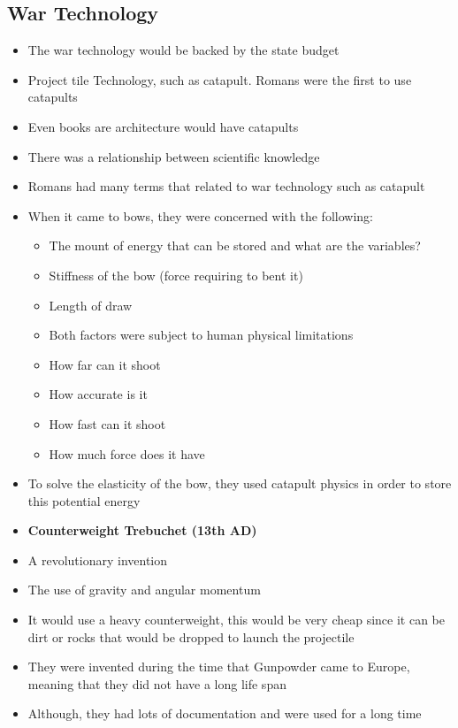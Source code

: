 \documentclass{article}
\begin{document}
\subsection{War Technology}
\begin{itemize}
  \item The war technology would be backed by the state budget
  \item Project tile Technology, such as catapult.
    Romans were the first to use catapults
  \item Even books are architecture would have catapults
  \item There was a relationship between scientific knowledge
  \item Romans had many terms that related to war technology such as catapult
  \item When it came to bows, they were concerned with the following:
    \begin{itemize}
      \item The mount of energy that can be stored and what are
        the variables?
      \item Stiffness of the bow (force requiring to bent it)
      \item Length of draw
      \item Both factors were subject
        to human physical limitations
      \item How far can it shoot
      \item How accurate is it
      \item How fast can it shoot
      \item How much force does it have
    \end{itemize}
  \item To solve the elasticity of the bow, they
    used catapult physics in order to store
    this potential energy
  \item \textbf{Counterweight Trebuchet (13th AD)}
  \item A revolutionary invention
  \item The use of gravity and angular momentum
  \item It would use a heavy counterweight,
    this would be very cheap since it can be dirt or rocks
    that would be dropped to launch the projectile
  \item They were invented during the time that Gunpowder came to Europe,
    meaning that they did not have a long life span
  \item Although, they had lots of documentation
    and were used for a long time
\end{itemize}
\end{document}
